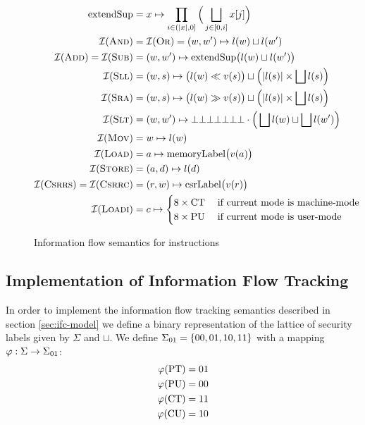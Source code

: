 \begin{figure}
    \begin{align*}
        \text{extendSup} &= x \mapsto \prod_{i \in (|x|, 0]} \Big( \bigsqcup_{j \in [0, i]} x[j] \Big) \\
        \mathcal{I}(\textsc{And}) &= \mathcal{I}(\textsc{Or}) = (w, w') \mapsto l(w) \sqcup l(w') \\
        \mathcal{I}(\textsc{Add}) = \mathcal{I}(\textsc{Sub}) &= (w, w') \mapsto \text{extendSup}\big(l(w) \sqcup l(w') \big) \\
        \mathcal{I}(\textsc{Sll}) &= (w, s) \mapsto \big(l(w) \ll v(s) \big) \sqcup \Big(|l(s)| \times \bigsqcup l(s) \Big) \\
        \mathcal{I}(\textsc{Sra}) &= (w, s) \mapsto \big(l(w) \gg v(s) \big) \sqcup \Big(|l(s)| \times \bigsqcup l(s) \Big) \\
        \mathcal{I}(\textsc{Slt}) &= (w, w') \mapsto \bot\bot\bot\bot\bot\bot\bot \cdot \Big(\bigsqcup l(w) \sqcup \bigsqcup l(w') \Big) \\
        \mathcal{I}(\textsc{Mov}) &= w \mapsto l(w) \\
        \mathcal{I}(\textsc{Load}) &= a \mapsto \text{memoryLabel}\big(v(a) \big) \\
        \mathcal{I}(\textsc{Store}) &= (a, d) \mapsto l(d) \\
        \mathcal{I}(\textsc{Csrrs}) = \mathcal{I}(\textsc{Csrrc}) &= (r, w) \mapsto \text{csrLabel}\big(v(r) \big) \\
        \mathcal{I}(\textsc{Loadi}) &= c \mapsto \begin{cases}
            8 \times \text{CT} & \; \text{if current mode is machine-mode} \\
            8 \times \text{PU} & \; \text{if current mode is user-mode}
        \end{cases}
    \end{align*}
    \caption{Information flow semantics for instructions}
    \label{fig:ifc-semantics}
\end{figure}

\subsection{Implementation of Information Flow Tracking}
\label{sec:ifc-implementation}

In order to implement the information flow tracking semantics described in section \ref{sec:ifc-model} we define a binary representation of the lattice of security labels given by $ \Sigma $ and $ \sqcup $.
We define $ \Sigma_{01} = \{ 00, 01, 10, 11 \}$ with a mapping $ \varphi : \Sigma \rightarrow \Sigma_{01} $:
\begin{align*}
    \varphi(\text{PT}) &= 01 \\
    \varphi(\text{PU}) &= 00 \\
    \varphi(\text{CT}) &= 11 \\
    \varphi(\text{CU}) &= 10
\end{align*}

